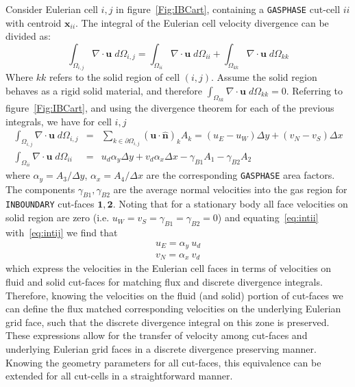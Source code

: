\documentclass[12pt]{article}
\begin{document}
Consider Eulerian cell $i,j$ in figure~\ref{Fig:IBCart}, containing a \texttt{GASPHASE} cut-cell $ii$ with centroid $\mathbf{x}_{ii}$. The integral of the Eulerian cell velocity divergence can be divided as:
%
\begin{equation}
   \int_{\Omega_{i,j}}{ \nabla \cdot \mathbf{u}} \; d\Omega_{i,j} = \int_{\Omega_{ii}}{ \nabla \cdot \mathbf{u}} \; d\Omega_{ii} +
                                                                                                     \int_{\Omega_{kk}}{ \nabla \cdot \mathbf{u}} \; d\Omega_{kk}
\end{equation}
%
Where $kk$ refers to the solid region of cell $(i,j)$. Assume the solid region behaves as a rigid solid material, and therefore $\int_{\Omega_{kk}}{ \nabla \cdot \mathbf{u}} \; d\Omega_{kk} = 0$.
Referring to figure~\ref{Fig:IBCart}, and using the divergence theorem for each of the previous integrals, we have for cell $i,j$
%
\begin{eqnarray}
  \int_{\Omega_{i,j}}{ \nabla \cdot \mathbf{u}} \; d\Omega_{i,j} &=& \sum_{k \in \partial \Omega_{i,j}}{(\mathbf{u} \cdot \mathbf{\hat{n}})_k A_k} = (u_E-u_W) \Delta y + (v_N-v_S) \Delta x \label{eq:intij}\\
  \int_{\Omega_{ii}}{ \nabla \cdot \mathbf{u}} \; d\Omega_{ii}  &=& u_d \alpha_y \Delta y + v_d \alpha_x \Delta x -
  \gamma_{B1} A_1 - \gamma_{B2} A_2   \label{eq:intii}
\end{eqnarray}
%
where $\alpha_y=A_3/\Delta y$, $\alpha_x=A_4/\Delta x$ are the corresponding  \texttt{GASPHASE} area factors. The components $ \gamma_{B1}, \gamma_{B2}$ are the average normal velocities into the gas region for  \texttt{INBOUNDARY} cut-faces $\mathbf{1},\mathbf{2}$. Noting that for a stationary body all face velocities on solid region are zero (i.e. $u_W=v_S=\gamma_{B1}=\gamma_{B2}=0$) and equating~\eqref{eq:intii} with~\eqref{eq:intij} we find that
%
\begin{eqnarray}
  u_E = \alpha_y \: u_d  \label{eq:uE} \\
  v_N  = \alpha_x \: v_d  \label{eq:vN}
\end{eqnarray}
%
which express the velocities in the Eulerian cell faces in terms of velocities on fluid and solid cut-faces for matching flux and discrete divergence integrals. Therefore, knowing the velocities on the fluid (and solid) portion of cut-faces we can define the flux matched corresponding velocities on the underlying Eulerian grid face, such that the discrete divergence integral on this zone is preserved.
These expressions allow for the transfer of velocity among cut-faces and underlying Eulerian grid faces in a discrete divergence preserving manner.
Knowing the geometry parameters for all cut-faces, this equivalence can be extended for all cut-cells in a straightforward manner.
\end{document}
